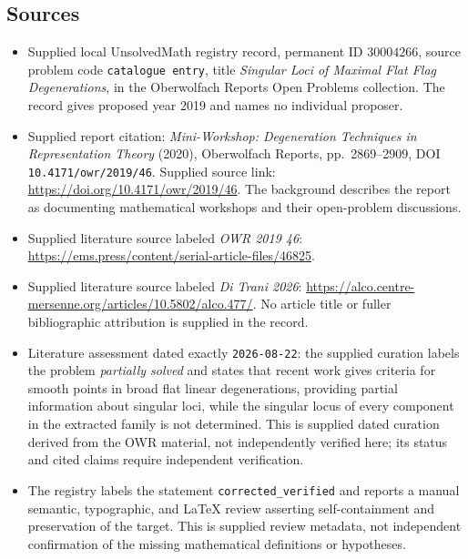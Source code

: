 \documentclass[11pt]{article}
\begin{document}
\subsection{Sources}
\begin{itemize}
\item Supplied local UnsolvedMath registry record, permanent ID \(30004266\), source problem code \texttt{catalogue entry}, title \emph{Singular Loci of Maximal Flat Flag Degenerations}, in the Oberwolfach Reports Open Problems collection. The record gives proposed year 2019 and names no individual proposer.
\item Supplied report citation: \emph{Mini-Workshop: Degeneration Techniques in Representation Theory} (2020), Oberwolfach Reports, pp.\ 2869--2909, DOI \texttt{10.4171/owr/2019/46}. Supplied source link: \url{https://doi.org/10.4171/owr/2019/46}. The background describes the report as documenting mathematical workshops and their open-problem discussions.
\item Supplied literature source labeled \emph{OWR 2019 46}: \url{https://ems.press/content/serial-article-files/46825}.
\item Supplied literature source labeled \emph{Di Trani 2026}: \url{https://alco.centre-mersenne.org/articles/10.5802/alco.477/}. No article title or fuller bibliographic attribution is supplied in the record.
\item Literature assessment dated exactly \texttt{2026-08-22}: the supplied curation labels the problem \emph{partially solved} and states that recent work gives criteria for smooth points in broad flat linear degenerations, providing partial information about singular loci, while the singular locus of every component in the extracted family is not determined. This is supplied dated curation derived from the OWR material, not independently verified here; its status and cited claims require independent verification.
\item The registry labels the statement \texttt{corrected\_verified} and reports a manual semantic, typographic, and LaTeX review asserting self-containment and preservation of the target. This is supplied review metadata, not independent confirmation of the missing mathematical definitions or hypotheses.
\end{itemize}
\end{document}
